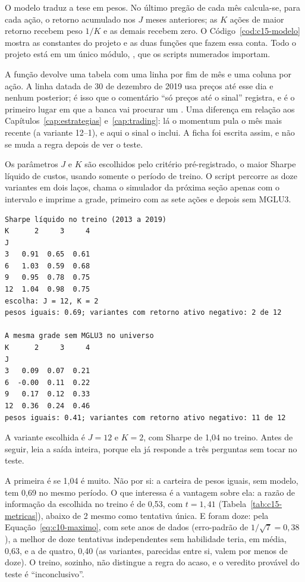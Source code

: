 O modelo traduz a tese em pesos. No último pregão de cada mês calcula-se, para cada ação, o retorno acumulado nos $J$ meses anteriores; as $K$ ações de maior retorno recebem peso $1/K$ e as demais recebem zero. O Código~\ref{cod:c15-modelo} mostra as constantes do projeto e as duas funções que fazem essa conta. Todo o projeto está em um único módulo, , que os scripts numerados importam.



A função  devolve uma tabela com uma linha por fim de mês e uma coluna por ação. A linha datada de 30 de dezembro de 2019 usa preços até esse dia e nenhum posterior; é isso que o comentário ``só preços até o sinal'' registra, e é o primeiro lugar em que a banca vai procurar um . Uma diferença em relação aos Capítulos~\ref{cap:estrategias} e~\ref{cap:trading}: lá o momentum pula o mês mais recente (a variante 12--1), e aqui o sinal o inclui. A ficha foi escrita assim, e não se muda a regra depois de ver o teste.

Os parâmetros $J$ e $K$ são escolhidos pelo critério pré-registrado, o maior Sharpe líquido de custos, usando somente o período de treino. O script  percorre as doze variantes em dois laços, chama o simulador da próxima seção apenas com o intervalo  e imprime a grade, primeiro com as sete ações e depois sem MGLU3.

\begin{lstlisting}[style=saida]
Sharpe líquido no treino (2013 a 2019)
K      2     3     4
J                   
3   0.91  0.65  0.61
6   1.03  0.59  0.68
9   0.95  0.78  0.75
12  1.04  0.98  0.75
escolha: J = 12, K = 2
pesos iguais: 0.69; variantes com retorno ativo negativo: 2 de 12

A mesma grade sem MGLU3 no universo
K      2     3     4
J                   
3   0.09  0.07  0.21
6  -0.00  0.11  0.22
9   0.17  0.12  0.33
12  0.36  0.24  0.46
pesos iguais: 0.41; variantes com retorno ativo negativo: 11 de 12
\end{lstlisting}

A variante escolhida é $J = 12$ e $K = 2$, com Sharpe de 1,04 no treino. Antes de seguir, leia a saída inteira, porque ela já responde a três perguntas sem tocar no teste.

A primeira é se 1,04 é muito. Não por si: a carteira de pesos iguais, sem modelo, tem 0,69 no mesmo período. O que interessa é a vantagem sobre ela: a razão de informação da escolhida no treino é de 0,53, com $t = 1,41$ (Tabela~\ref{tab:c15-metricas}), abaixo de 2 mesmo como tentativa única. E foram doze: pela Equação~\eqref{eq:c10-maximo}, com sete anos de dados (erro-padrão de $1/\sqrt{7} = 0,38$), a melhor de doze tentativas independentes sem habilidade teria, em média, 0,63, e a de quatro, 0,40 (as variantes, parecidas entre si, valem por menos de doze). O treino, sozinho, não distingue a regra do acaso, e o veredito provável do teste é ``inconclusivo''.

